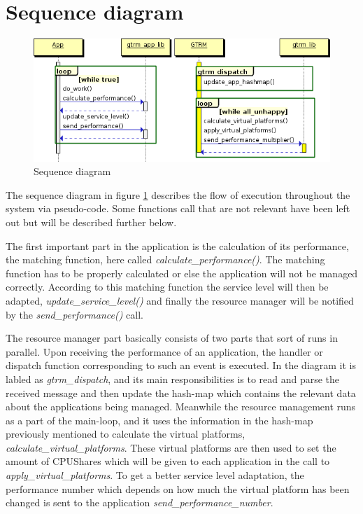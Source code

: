 \documentclass[nobiblatex]{LTHthesis}
\begin{document}
\section{Sequence diagram}
\begin{figure}
    \centering
    \includegraphics[width=\textwidth]{diag.png}
    \caption{Sequence diagram}
    \label{fig:sdiag}
\end{figure}
The sequence diagram in figure \ref{fig:sdiag} describes the flow of execution throughout the system via pseudo-code. Some functions call that are not relevant have been left out but will be described further below. 

The first important part in the application is the calculation of its performance, the matching function, here called \emph{calculate\_performance()}. The matching function has to be properly calculated or else the application will not be managed correctly. According to this matching function the service level will then be adapted, \emph{update\_service\_level()} and finally the resource manager will be notified by the \emph{send\_performance()} call.

The resource manager part basically consists of two parts that sort of runs in parallel. Upon receiving the performance of an application, the handler or dispatch function corresponding to such an event is executed. In the diagram it is labled as \emph{gtrm\_dispatch}, and its main responsibilities is to read and parse the received message and then update the hash-map which contains the relevant data about the applications being managed. Meanwhile the resource management runs as a part of the main-loop, and it uses the information in the hash-map previously mentioned to calculate the virtual platforms, \emph{calculate\_virtual\_platforms}. These virtual platforms are then used to set the amount of CPUShares which will be given to each application in the call to \emph{apply\_virtual\_platforms}. To get a better service level adaptation, the performance number which depends on how much the virtual platform has been changed is sent to the application \emph{send\_performance\_number}.
\end{document}
